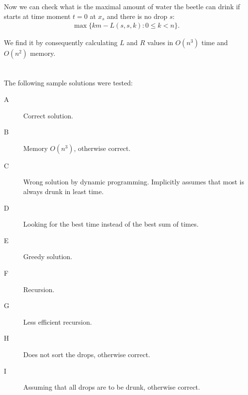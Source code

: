 \documentclass{boistyle}
\begin{document}
Now we can check what is the maximal amount of water the beetle can drink if starts at time moment $t=0$ at $x_s$ and there is no drop $s$:
\begin{align*}
\max \{ km - L(s, s, k): 0 \le k < n \} .
\end{align*}

We find it by consequently calculating $L$ and $R$ values in $O(n^3)$ time and $O(n^2)$ memory.

\newpage

\section*{\TestDataOverview}

The following sample solutions were tested:

\begin{description}
\item[A] Correct solution.
\item[B] Memory $O(n^3)$, otherwise correct.
\item[C] Wrong solution by dynamic programming. Implicitly assumes that most is always drunk in least time.
\item[D] Looking for the best time instead of the best sum of times.
\item[E] Greedy solution.
\item[F] Recursion.
\item[G] Less efficient recursion.
\item[H] Does not sort the drops, otherwise correct.
\item[I] Assuming that all drops are to be drunk, otherwise correct.
\end{description}
\end{document}
